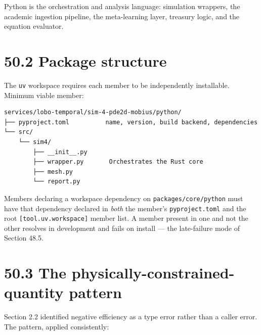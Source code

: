 \documentclass[
  11pt]{report}
\begin{document}
Python is the orchestration and analysis language: simulation wrappers,
the academic ingestion pipeline, the meta-learning layer, treasury
logic, and the equation evaluator.

\hypertarget{package-structure}{%
\section{50.2 Package structure}\label{package-structure}}

The \texttt{uv} workspace requires each member to be independently
installable. Minimum viable member:

\begin{verbatim}
services/lobo-temporal/sim-4-pde2d-mobius/python/
├── pyproject.toml          name, version, build backend, dependencies
└── src/
    └── sim4/
        ├── __init__.py
        ├── wrapper.py       Orchestrates the Rust core
        ├── mesh.py
        └── report.py
\end{verbatim}

Members declaring a workspace dependency on
\texttt{packages/core/python} must have that dependency declared in
\emph{both} the member's \texttt{pyproject.toml} and the root
\texttt{{[}tool.uv.workspace{]}} member list. A member present in one
and not the other resolves in development and fails on install --- the
late-failure mode of Section 48.5.

\hypertarget{the-physically-constrained-quantity-pattern}{%
\section{50.3 The physically-constrained-quantity
pattern}\label{the-physically-constrained-quantity-pattern}}

Section 2.2 identified negative efficiency as a type error rather than a
caller error. The pattern, applied consistently:
\end{document}
